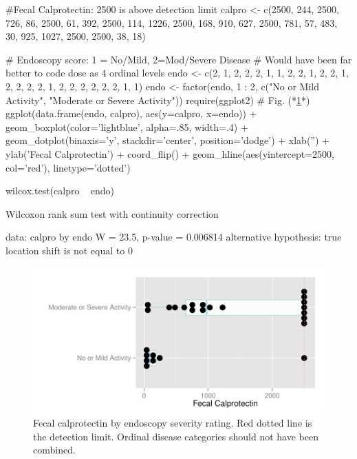 \begin{Schunk}
\begin{Sinput}
#Fecal Calprotectin: 2500 is above detection limit
calpro <- c(2500, 244, 2500, 726, 86, 2500, 61, 392, 2500, 114, 1226,
            2500, 168, 910, 627, 2500, 781, 57, 483, 30, 925, 1027,
            2500, 2500, 38, 18)

# Endoscopy score: 1 = No/Mild, 2=Mod/Severe Disease
# Would have been far better to code dose as 4 ordinal levels
endo <- c(2, 1, 2, 2, 2, 1, 1, 2, 2, 1, 2, 2, 1, 2, 2, 2, 2, 1, 2,
          2, 2, 2, 2, 2, 1, 1)
endo <- factor(endo, 1 : 2,
               c("No or Mild Activity", "Moderate or Severe Activity"))
require(ggplot2)   # Fig. (*\ref{fig:nonpar-calpro}*)
ggplot(data.frame(endo, calpro), aes(y=calpro, x=endo)) +
  geom_boxplot(color='lightblue', alpha=.85, width=.4) +
  geom_dotplot(binaxis='y', stackdir='center', position='dodge') +
    xlab('') + ylab('Fecal Calprotectin') + coord_flip() +
      geom_hline(aes(yintercept=2500, col='red'), linetype='dotted')
\end{Sinput}
\begin{Sinput}
wilcox.test(calpro ~ endo)
\end{Sinput}
\begin{Soutput}

	Wilcoxon rank sum test with continuity correction

data:  calpro by endo
W = 23.5, p-value = 0.006814
alternative hypothesis: true location shift is not equal to 0
\end{Soutput}
\begin{figure}[htbp]

\centerline{\includegraphics{nonpar-calpro-1} }

\caption[Fecal calprotectin by severity]{Fecal calprotectin by endoscopy severity rating. Red dotted line is the detection limit.  Ordinal disease categories should not have been combined.}\label{fig:nonpar-calpro}
\end{figure}
\end{Schunk}
